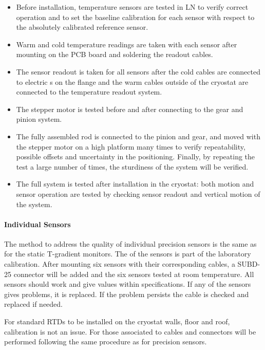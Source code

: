 \begin{itemize}
\item
Before installation, temperature sensors are tested in LN to verify correct operation and to set the baseline calibration for each sensor with respect to the absolutely calibrated reference sensor. 
\item
Warm and cold temperature readings are taken with each sensor after mounting on the PCB board and soldering %
the readout cables.
\item
The sensor readout is taken for all sensors after the cold cables are connected to electric \fdth{}s on the flange and the warm cables outside of the cryostat are connected to the temperature readout system.
\item 
The stepper motor is tested before and after connecting to the gear and pinion system.
\item
The fully assembled rod is connected to the pinion and gear, and moved with the stepper motor on a high platform many times to verify repeatability, possible offsets and uncertainty in the positioning. Finally, by repeating the test a large number of times, the sturdiness of the system will be verified.
\item
The full system is tested after installation in the cryostat: both motion and sensor operation are tested by checking %
sensor readout and vertical motion of the system.
\end{itemize} 

\paragraph{Individual Sensors}
\label{sec:fdgen-slow-cryo-qc-is}

The method to address the quality of individual precision sensors is the same as for the static T-gradient monitors.
The  of the sensors is part of the laboratory calibration. After mounting six sensors with their corresponding cables, a
SUBD-25 connector will be added and the six sensors tested at room temperature. All sensors should work and give values within specifications.  
If any of the sensors gives problems, it is replaced.  If the problem persists the cable is checked and replaced if needed.

For standard RTDs to be installed on the cryostat walls, floor and roof, calibration is not an issue. For those  associated to cables and connectors will be performed following the same procedure as for precision sensors. 

